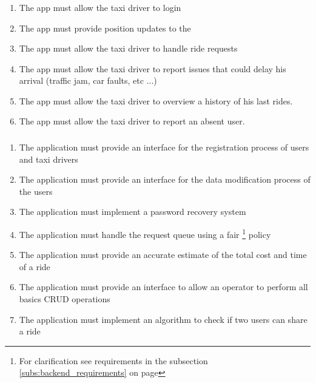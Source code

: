 \subsubsection{} 
\label{ssub:mobile_application_driver}
\begin{enumerate} [resume*]
	\item The app must allow the taxi driver to login
	\item  The app must provide position updates to the 
	\item  The app must allow the taxi driver to handle ride requests
	\item  The app must allow the taxi driver to report issues that could delay his arrival (traffic jam, car faults, etc ...)
	\item  The app must allow the taxi driver to overview a history of his last rides.
	\item  The app must allow the taxi driver to report an absent user.
\end{enumerate}

\subsubsection{} 
\label{ssub:back_end_application}
\begin{enumerate} [resume*]

	\item  The application must provide an interface for the registration process of users and taxi drivers
	\item The application must provide an interface for the data modification process of the users
	\item The application must implement a password recovery system
	\item  The application must handle the request queue using a fair \footnote{For clarification see requirements in the  subsection \ref{subs:backend_requirements} on page \pageref{subs:backend_requirements}} policy 
	\item  The application must provide an accurate estimate of the total cost and time of a ride
	\item  The application must provide an interface to allow an operator to perform all basics CRUD operations
	\item The application must implement an algorithm to check if two users can share a ride

\end{enumerate}

